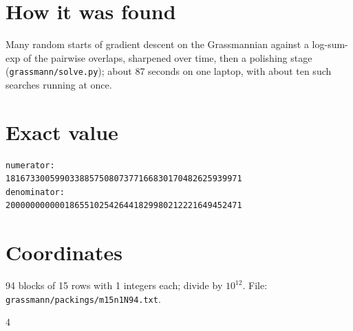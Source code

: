\documentclass[11pt,a4paper]{article}
\begin{document}
\section{How it was found}
Many random starts of gradient descent on the Grassmannian against a log-sum-exp of the pairwise overlaps, sharpened over time, then a polishing stage (\texttt{grassmann/solve.py}); about 87 seconds on one laptop, with about ten such searches running at once.


\appendix
\section{Exact value}
{\small
\begin{verbatim}
numerator:
181673300599033885750807377166830170482625939971
denominator:
200000000000186551025426441829980212221649452471
\end{verbatim}}

\section{Coordinates}
94 blocks of 15 rows with 1 integers each; divide by $10^{12}$. File: \texttt{grassmann/packings/m15n1N94.txt}.
{\tiny
\begin{multicols}{4}
\end{multicols}}
\end{document}

